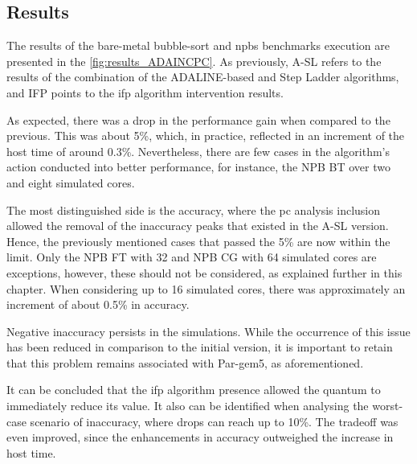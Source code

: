 \subsection{Results}

The results of the bare-metal bubble-sort and \glspl{npb} benchmarks execution are presented in the \autoref{fig:results_ADAINCPC}. As previously, 
A-SL refers to the results of the combination of the ADALINE-based and Step Ladder algorithms, and IFP points to the 
\gls{ifp} algorithm intervention results.

As expected, there was a drop in the performance gain when compared to the previous. This was about 5\%, which, in practice, 
reflected in an increment of the host time of around 0.3\%. Nevertheless, there are few cases in the algorithm's action 
conducted into better performance, for instance, the NPB BT over two and eight simulated cores. 

The most distinguished side is the accuracy, where the \gls{pc} analysis inclusion allowed the removal of the inaccuracy peaks that existed 
in the A-SL version. Hence, the previously mentioned cases that passed the 5\% are now within the limit. Only the NPB FT with 32
and NPB CG with 64 simulated cores are exceptions, however, these should not be considered, as explained further in this chapter. 
When considering up to 16 simulated cores, there was approximately an increment 
of about 0.5\% in accuracy. 

Negative inaccuracy persists in the simulations. While the occurrence of this issue has been reduced in comparison to the initial version, 
it is important to retain that this problem remains associated with Par-gem5, as aforementioned. 

It can be concluded that the \gls{ifp} algorithm presence allowed the quantum to immediately reduce its value. It also can be identified when 
analysing the worst-case scenario of inaccuracy, where drops can reach up to 10\%. The tradeoff was even improved, since 
the enhancements in accuracy outweighed the increase in host time.

